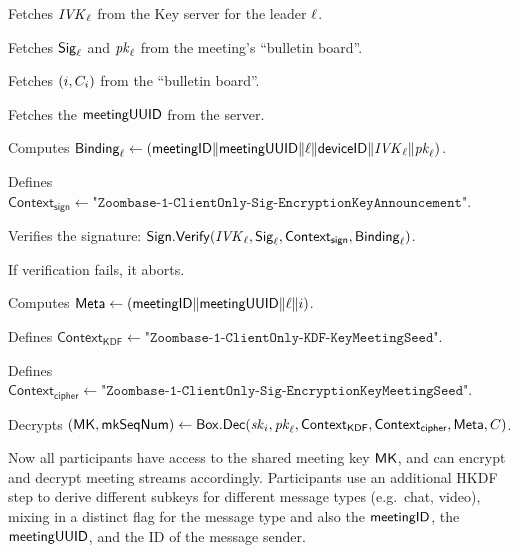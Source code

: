 \begingroup
\RaggedRight
\begin{enumerate*}
\item Fetches $\mathit{IVK}_{\ell}$ from the Key server for the leader $\ell$.
\item Fetches ${\sf Sig}_{\ell}$ and $\mathit{pk}_\ell$ from the meeting's ``bulletin board''.
\item Fetches $(i, C_i)$ from the ``bulletin board''.
\item Fetches the ${\sf meetingUUID}$ from the server.
\item Computes ${\sf Binding}_\ell \leftarrow \left( {\sf meetingID} \| \allowbreak {\sf meetingUUID} \| \ell \allowbreak \| {\sf deviceID} \| \mathit{IVK}_\ell \| \allowbreak \mathit{pk}_\ell \right)$.
\item Defines $\textsf{Context}_\textsf{sign} \leftarrow \texttt{"Zoombase-1-ClientOnly-Sig-EncryptionKeyAnnouncement"}$.
\item Verifies the signature: ${\sf Sign}.\mathsf{Verify}(\mathit{IVK}_{\ell}, {\sf Sig}_\ell, \textsf{Context}_\textsf{sign}, {\sf Binding}_\ell)$.
\item If verification fails, it aborts.
\item Computes ${\sf Meta} \leftarrow \left({\sf meetingID} \| \allowbreak {\sf meetingUUID} \| \allowbreak \ell \| i \right)$.
\item Defines $\textsf{Context}_\textsf{KDF} \leftarrow \texttt{"Zoombase-1-ClientOnly-KDF-KeyMeetingSeed"}$.
\item Defines $\textsf{Context}_\textsf{cipher} \leftarrow \texttt{"Zoombase-1-ClientOnly-Sig-EncryptionKeyMeetingSeed"}$.
\item Decrypts $({\sf MK}, \mathsf{mkSeqNum}) \leftarrow {\sf Box}.\mathsf{Dec}(\mathit{sk}_{i}, \mathit{pk}_{\ell}, \textsf{Context}_\textsf{KDF}, \textsf{Context}_\textsf{cipher}, {\sf Meta}, C)$.
   \label{participantJoinRekeyNonLeader}
\end{enumerate*}
\endgroup

Now all participants have access to the shared meeting key ${\sf MK}$, and can
encrypt and decrypt meeting streams accordingly. Participants use an additional
HKDF step to derive different subkeys for different message types (e.g.\ chat,
video), mixing in a distinct flag for the message type and also the
${\sf meetingID}$, the ${\sf meetingUUID}$, and the ID of the message sender.

